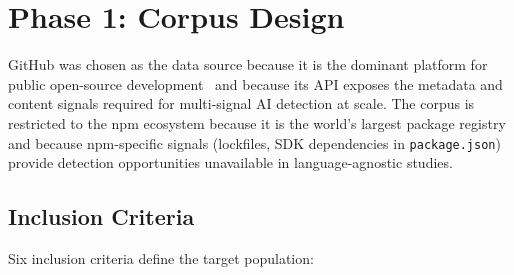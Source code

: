 \section{Phase 1: Corpus Design}
\label{sec:meth:corpus}

GitHub was chosen as the data source because it is the dominant platform for public open-source development~\cite{dabic2021} and because its API exposes the metadata and content signals required for multi-signal AI detection at scale. The corpus is restricted to the npm ecosystem because it is the world's largest package registry and because npm-specific signals (lockfiles, SDK dependencies in \texttt{package.json}) provide detection opportunities unavailable in language-agnostic studies.

\subsection{Inclusion Criteria}

Six inclusion criteria define the target population:

